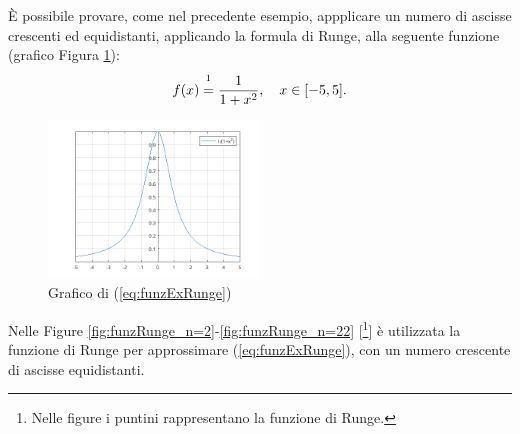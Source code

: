 È possibile provare, come nel precedente esempio, appplicare un numero di ascisse crescenti ed equidistanti, applicando la formula di Runge, alla seguente funzione (grafico  Figura \ref{fig:funzRunge-5,5}):
\begin{equation}\label{eq:funzExRunge}
    f(x)\overset{\footnotemark}{=}\frac{1}{1+x^2},\quad x\in [-5,5].
\end{equation}


\begin{figure}
    \centering
    \includegraphics[width=0.5\textwidth]{immagini/funzioneRunge-5,5.png}
    \caption{Grafico di (\ref{eq:funzExRunge})}\label{fig:funzRunge-5,5}
\end{figure}

Nelle Figure \ref{fig:funzRunge_n=2}-\ref{fig:funzRunge_n=22} [\footnote{Nelle figure i puntini rappresentano la funzione di Runge.}] è utilizzata la funzione di Runge per approssimare (\ref{eq:funzExRunge}), con un numero crescente di ascisse equidistanti.

